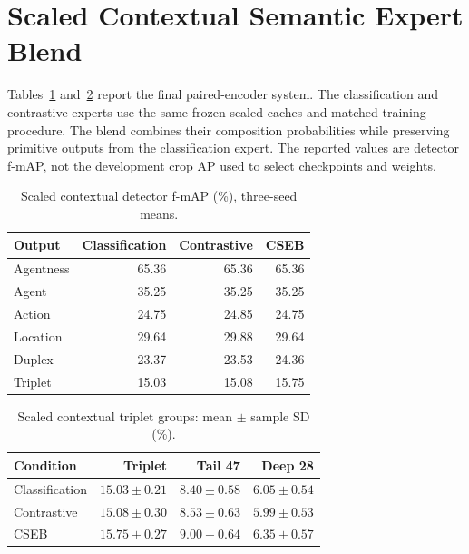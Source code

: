 \section{Scaled Contextual Semantic Expert Blend}

Tables~\ref{tab:scaled-all} and~\ref{tab:scaled-tail} report the final paired-encoder system. The classification and contrastive experts use the same frozen scaled caches and matched training procedure. The blend combines their composition probabilities while preserving primitive outputs from the classification expert. The reported values are detector f-mAP, not the development crop AP used to select checkpoints and weights.

\begin{table}[htbp]
\centering
\caption{Scaled contextual detector f-mAP (\%), three-seed means.}
\label{tab:scaled-all}
\begin{singlespace}
\begin{tabular}{@{}lrrr@{}}
\toprule
\textbf{Output} & \textbf{Classification} & \textbf{Contrastive} & \textbf{CSEB} \\
\midrule
Agentness & 65.36 & 65.36 & 65.36 \\
Agent & 35.25 & 35.25 & 35.25 \\
Action & 24.75 & 24.85 & 24.75 \\
Location & 29.64 & 29.88 & 29.64 \\
Duplex & 23.37 & 23.53 & 24.36 \\
Triplet & 15.03 & 15.08 & 15.75 \\
\bottomrule
\end{tabular}
\end{singlespace}
\end{table}

\begin{table}[htbp]
\centering
\caption{Scaled contextual triplet groups: mean $\pm$ sample SD (\%).}
\label{tab:scaled-tail}
\begin{singlespace}
\begin{tabularx}{\textwidth}{@{}Xrrr@{}}
\toprule
\textbf{Condition} & \textbf{Triplet} & \textbf{Tail 47} & \textbf{Deep 28} \\
\midrule
Classification & $15.03\pm0.21$ & $8.40\pm0.58$ & $6.05\pm0.54$ \\
Contrastive & $15.08\pm0.30$ & $8.53\pm0.63$ & $5.99\pm0.53$ \\
CSEB & $15.75\pm0.27$ & $9.00\pm0.64$ & $6.35\pm0.57$ \\
\bottomrule
\end{tabularx}
\end{singlespace}
\end{table}


